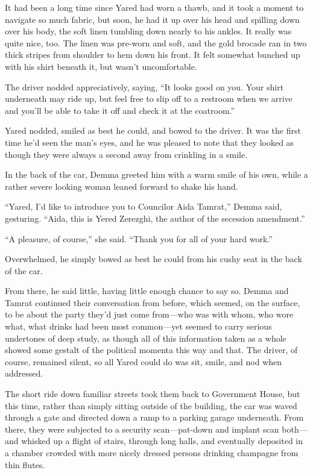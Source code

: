 It had been a long time since Yared had worn a thawb, and it took a moment to navigate so much fabric, but soon, he had it up over his head and spilling down over his body, the soft linen tumbling down nearly to his ankles. It really was quite nice, too. The linen was pre-worn and soft, and the gold brocade ran in two thick stripes from shoulder to hem down his front. It felt somewhat bunched up with his shirt beneath it, but wasn't uncomfortable.

The driver nodded appreciatively, saying, ``It looks good on you. Your shirt underneath may ride up, but feel free to slip off to a restroom when we arrive and you'll be able to take it off and check it at the coatroom.''

Yared nodded, smiled as best he could, and bowed to the driver. It was the first time he'd seen the man's eyes, and he was pleased to note that they looked as though they were always a second away from crinkling in a smile.

In the back of the car, Demma greeted him with a warm smile of his own, while a rather severe looking woman leaned forward to shake his hand.

``Yared, I'd like to introduce you to Councilor Aida Tamrat,'' Demma said, gesturing. ``Aida, this is Yered Zerezghi, the author of the secession amendment.''

``A pleasure, of course,'' she said. ``Thank you for all of your hard work.''

Overwhelmed, he simply bowed as best he could from his cushy seat in the back of the car.

From there, he said little, having little enough chance to say so. Demma and Tamrat continued their conversation from before, which seemed, on the surface, to be about the party they'd just come from---who was with whom, who wore what, what drinks had been most common---yet seemed to carry serious undertones of deep study, as though all of this information taken as a whole showed some gestalt of the political momenta this way and that. The driver, of course, remained silent, so all Yared could do was sit, smile, and nod when addressed.

The short ride down familiar streets took them back to Government House, but this time, rather than simply sitting outside of the building, the car was waved through a gate and directed down a ramp to a parking garage underneath. From there, they were subjected to a security scan---pat-down and implant scan both---and whisked up a flight of stairs, through long halls, and eventually deposited in a chamber crowded with more nicely dressed persons drinking champagne from thin flutes.


